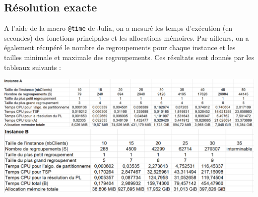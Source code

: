 \documentclass[french, 11pt, a4paper]{article} %
\begin{document}
\subsection{Résolution exacte}
A l'aide de la macro \texttt{@time} de Julia, on a mesuré les temps d'exécution (en secondes) des fonctions principales et les allocations mémoires.
Par ailleurs, on a également récupéré le nombre de regroupements pour chaque instance et les tailles minimale et maximale des regroupements.
Ces résultats sont donnés par les tableaux suivants :
\begin{center}
    \includegraphics[scale=0.50]{ResExacte_InstA.PNG}
    \includegraphics[scale=0.55]{ResExacte_InstB.PNG}
\end{center}
\end{document}
